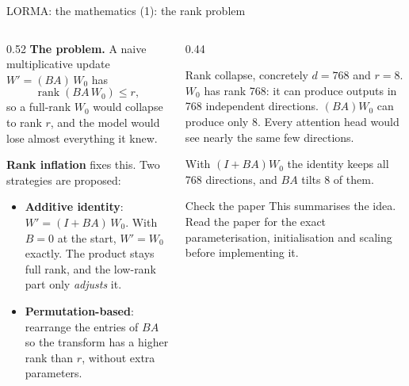 \documentclass[aspectratio=169,11pt]{beamer}
\begin{document}
\begin{frame}{LORMA: the mathematics (1): the rank problem}
  \begin{columns}[T]
    \begin{column}{0.52\textwidth}
      \small
      \textbf{The problem.} A naive multiplicative update $W'=(BA)\,W_0$ has
      \[
        \operatorname{rank}(BA\,W_0)\le r,
      \]
      so a full-rank $W_0$ would collapse to rank $r$, and the model would lose almost everything it knew.
      \vspace{1mm}

      \textbf{Rank inflation} fixes this. Two strategies are proposed:
      \begin{itemize}
        \item \textbf{Additive identity}: $W'=(I+BA)\,W_0$. With $B=0$ at the start, $W'=W_0$ exactly. The product stays full rank, and the low-rank part only \emph{adjusts} it.
        \item \textbf{Permutation-based}: rearrange the entries of $BA$ so the transform has a higher rank than $r$, without extra parameters.
      \end{itemize}
    \end{column}
    \begin{column}{0.44\textwidth}
      \begin{exampleblock}{Rank collapse, concretely}
        \small
        $d=768$ and $r=8$. $W_0$ has rank 768: it can produce outputs in 768 independent directions.
        $(BA)W_0$ can produce only 8. Every attention head would see nearly the same few directions.
        \vspace{1mm}

        With $(I+BA)W_0$ the identity keeps all 768 directions, and $BA$ tilts 8 of them.
      \end{exampleblock}
      \begin{alertblock}{Check the paper}
        \scriptsize
        This summarises the idea. Read the paper for the exact parameterisation, initialisation and scaling before implementing it.
      \end{alertblock}
    \end{column}
  \end{columns}
\end{frame}
\end{document}
